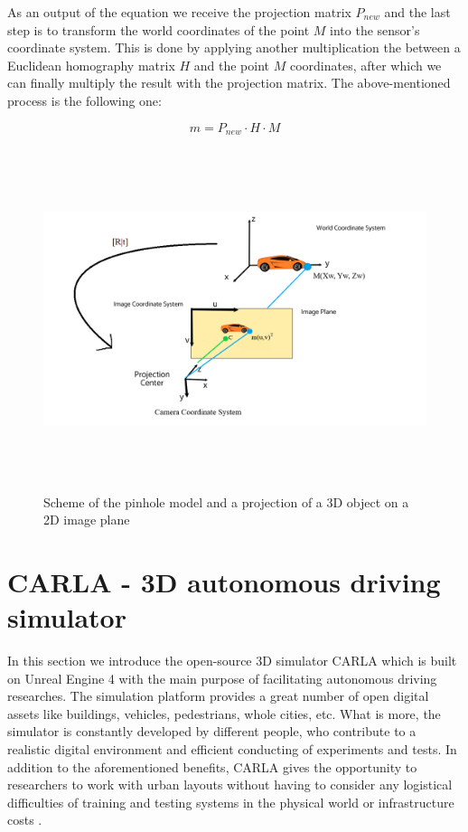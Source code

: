 As an output of the equation we receive the projection matrix $P_{new}$ and the last step is to transform the world coordinates of the point $M$ into the sensor's coordinate system. This is done by applying another multiplication the between a Euclidean homography matrix $H$ and the point $M$ coordinates, after which we can finally multiply the result with the projection matrix. The above-mentioned process is the following one:

\begin{equation}
m = P_{new} \cdot H \cdot M
\end{equation}

\begin{figure}
\centering
\includegraphics[width = \textwidth, height = 10cm]{images/camera_model_pic.png}
\caption[Single camera's model]{Scheme of the pinhole model and a projection of a 3D object on a 2D image plane\label{fig:camera_model}}
\end{figure}

\section{CARLA - 3D autonomous driving simulator}\label{carla_background}
In this section we introduce the open-source 3D simulator CARLA which is built on Unreal Engine 4 with the main purpose of facilitating autonomous driving researches. The simulation platform provides a great number of open digital assets like buildings, vehicles, pedestrians, whole cities, etc. What is more, the simulator is constantly developed by different people, who contribute to a realistic digital environment and efficient conducting of experiments and tests. In addition to the aforementioned benefits, CARLA gives the opportunity to researchers to work with urban layouts without having to consider any logistical difficulties of training and testing systems in the physical world or infrastructure costs \cite{carla_paper}. 

